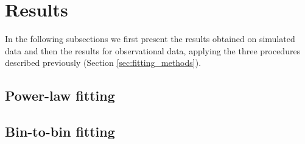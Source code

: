 \section{Results}
\label{sec:results}

In the following subsections we first present the results obtained on simulated data and then the results for observational data, applying the three procedures described previously (Section \ref{sec:fitting_methods}).

\subsection{Power-law fitting}










\subsection{Bin-to-bin fitting}






